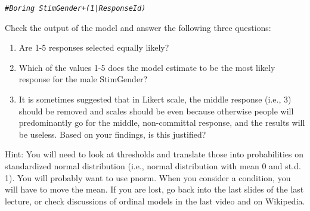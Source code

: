 \documentclass{article}\usepackage[]{graphicx}\usepackage[]{color}
\makeatletter
\newcommand{\hlcom}[1]{\textcolor[rgb]{0.678,0.584,0.686}{\textit{#1}}}%
\newenvironment{kframe}{%
 \def\at@end@of@kframe{}%
 \ifinner\ifhmode%
  \def\at@end@of@kframe{\end{minipage}}%
  \begin{minipage}{\columnwidth}%
 \fi\fi%
 \def\FrameCommand##1{\hskip\@totalleftmargin \hskip-\fboxsep
 \colorbox{shadecolor}{##1}\hskip-\fboxsep
     \hskip-\linewidth \hskip-\@totalleftmargin \hskip\columnwidth}%
 \MakeFramed {\advance\hsize-\width
   \@totalleftmargin\z@ \linewidth\hsize
   \@setminipage}}%
 {\par\unskip\endMakeFramed%
 \at@end@of@kframe}
\newenvironment{knitrout}{}{} %
\makeatother
\begin{document}
\begin{knitrout}
\color{fgcolor}\begin{kframe}
\begin{alltt}
\hlcom{# Boring ~ StimGender + (1|ResponseId)}
\end{alltt}
\end{kframe}
\end{knitrout}

Check the output of the model and answer the following three questions:

\begin{enumerate}
    \item Are 1-5 responses selected equally likely?
    \item Which of the values 1-5 does the model estimate to be the most likely response for the male StimGender?
    \item It is sometimes suggested that in Likert scale, the middle response (i.e., 3) should be removed and scales should be even because otherwise people will predominantly go for the middle, non-committal response, and the results will be useless. Based on your findings, is this justified?
\end{enumerate}

Hint: You will need to look at thresholds and translate those into probabilities on standardized normal distribution (i.e., normal distribution with mean 0 and st.d. 1). You will probably want to use pnorm. When you consider a condition, you will have to move the mean. If you are lost, go back into the last slides of the last lecture, or check discussions of ordinal models in the last video and on Wikipedia.
\end{document}
